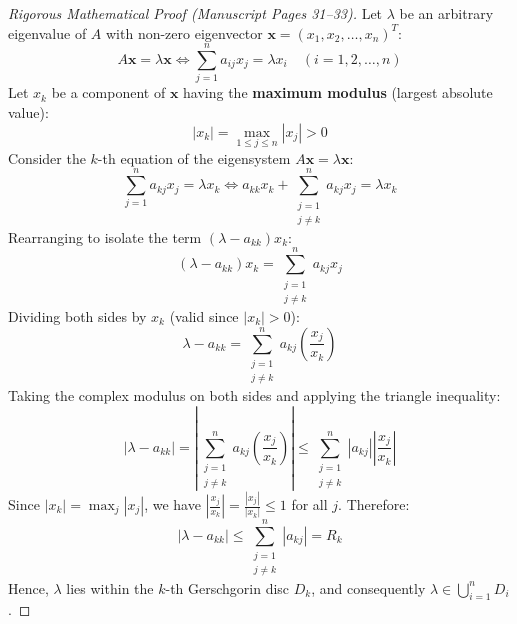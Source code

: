 \begin{proof}[Rigorous Mathematical Proof (Manuscript Pages 31--33)]
Let $\lambda$ be an arbitrary eigenvalue of $A$ with non-zero eigenvector $\mathbf{x} = (x_1, x_2, \dots, x_n)^T$:
\begin{equation}
    A \mathbf{x} = \lambda \mathbf{x} \iff \sum_{j=1}^n a_{ij} x_j = \lambda x_i \quad (i = 1, 2, \dots, n)
\end{equation}
Let $x_k$ be a component of $\mathbf{x}$ having the \textbf{maximum modulus} (largest absolute value):
\begin{equation}
    |x_k| = \max_{1 \le j \le n} |x_j| > 0
\end{equation}
Consider the $k$-th equation of the eigensystem $A \mathbf{x} = \lambda \mathbf{x}$:
\begin{equation}
    \sum_{j=1}^n a_{kj} x_j = \lambda x_k \iff a_{kk} x_k + \sum_{\substack{j=1 \\ j \ne k}}^n a_{kj} x_j = \lambda x_k
\end{equation}
Rearranging to isolate the term $(\lambda - a_{kk})x_k$:
\begin{equation}
    (\lambda - a_{kk}) x_k = \sum_{\substack{j=1 \\ j \ne k}}^n a_{kj} x_j
\end{equation}
Dividing both sides by $x_k$ (valid since $|x_k| > 0$):
\begin{equation}
    \lambda - a_{kk} = \sum_{\substack{j=1 \\ j \ne k}}^n a_{kj} \left( \frac{x_j}{x_k} \right)
\end{equation}
Taking the complex modulus on both sides and applying the triangle inequality:
\begin{equation}
    |\lambda - a_{kk}| = \left| \sum_{\substack{j=1 \\ j \ne k}}^n a_{kj} \left( \frac{x_j}{x_k} \right) \right| \le \sum_{\substack{j=1 \\ j \ne k}}^n |a_{kj}| \left| \frac{x_j}{x_k} \right|
\end{equation}
Since $|x_k| = \max_j |x_j|$, we have $\left| \frac{x_j}{x_k} \right| = \frac{|x_j|}{|x_k|} \le 1$ for all $j$. Therefore:
\begin{equation}
    \boxed{|\lambda - a_{kk}| \le \sum_{\substack{j=1 \\ j \ne k}}^n |a_{kj}| = R_k}
\end{equation}
Hence, $\lambda$ lies within the $k$-th Gerschgorin disc $D_k$, and consequently $\lambda \in \bigcup_{i=1}^n D_i$.
\end{proof}

